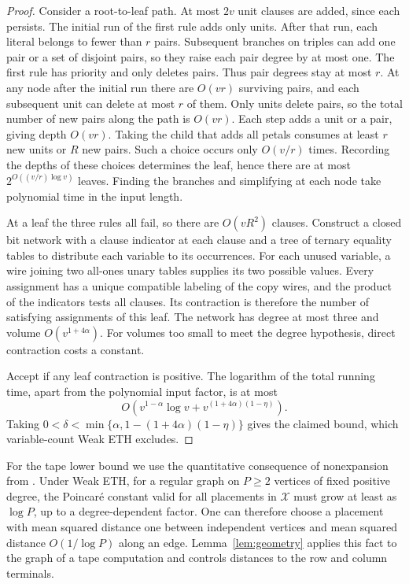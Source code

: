 \begin{proof}
Consider a root-to-leaf path. At most $2v$ unit clauses are added,
since each persists. The initial run of the first rule adds only units.
After that run, each literal belongs to fewer than $r$ pairs. Subsequent
branches on triples can add one pair or a set of disjoint pairs, so
they raise each pair degree by at most one. The first rule has priority
and only deletes pairs. Thus pair degrees stay at most $r$. At any
node after the initial run there are $O(vr)$ surviving pairs, and
each subsequent unit can delete at most $r$ of them. Only units
delete pairs, so the total number of new pairs along the path is
$O(vr)$. Each step adds a unit or a pair, giving depth $O(vr)$.
Taking the child that adds all petals consumes at least $r$ new
units or $R$ new pairs. Such a choice occurs only $O(v/r)$ times.
Recording the depths of these choices determines the leaf, hence
there are at most $2^{O((v/r)\log v)}$ leaves. Finding the branches
and simplifying at each node take polynomial time in the input length.

At a leaf the three rules all fail, so there are $O(vR^2)$ clauses.
Construct a closed bit network with a clause indicator at each clause
and a tree of ternary equality tables to distribute each variable to
its occurrences. For each unused variable, a wire joining two all-ones unary tables
supplies its two possible values.
Every assignment has a unique compatible labeling of the copy wires,
and the product of the indicators tests all clauses. Its contraction
is therefore the number of satisfying assignments of this leaf.
The network has degree at most three and volume $O(v^{1+4\alpha})$.
For volumes too small to meet the degree hypothesis, direct contraction
costs a constant.

Accept if any leaf contraction is positive. The logarithm of the total
running time, apart from the polynomial input factor, is at most
\[
       O\!\left(v^{1-\alpha}\log v
             + v^{(1+4\alpha)(1-\eta)}\right).
\]
Taking $0<\delta<\min\{\alpha,1-(1+4\alpha)(1-\eta)\}$ gives the
claimed bound, which variable-count Weak ETH excludes.
\end{proof}

\noindent
For the tape lower bound we use the quantitative consequence of
nonexpansion from \cite[Theorem~]{oaP}. Under
Weak ETH, for a
regular graph on $P\ge2$ vertices of fixed positive degree, the
Poincar\'e constant valid for all placements in $\mathcal X$ must
grow at least as $\log P$, up to a degree-dependent factor. One can
therefore choose a placement with mean squared distance one between
independent vertices and mean squared distance $O(1/\log P)$ along
an edge. Lemma~\ref{lem:geometry} applies this fact to the graph of a
tape computation and controls distances to the row and column terminals.
